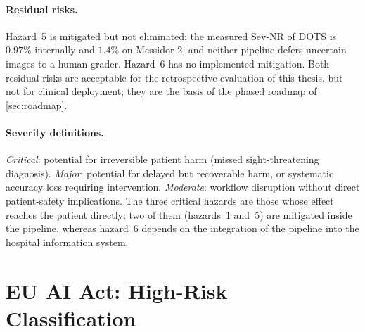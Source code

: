 \paragraph{Residual risks.}
Hazard~5 is mitigated but not eliminated: the measured Sev-NR of DOTS is $0.97\%$
internally and $1.4\%$ on Messidor-2, and neither pipeline defers uncertain images to a
human grader. Hazard~6 has no implemented mitigation. Both residual risks are acceptable
for the retrospective evaluation of this thesis, but not for clinical deployment; they are
the basis of the phased roadmap of \cref{sec:roadmap}.

\paragraph{Severity definitions.}
\emph{Critical}: potential for irreversible patient harm (missed sight-threatening
diagnosis). \emph{Major}: potential for delayed but recoverable harm, or systematic
accuracy loss requiring intervention. \emph{Moderate}: workflow disruption without direct
patient-safety implications.
The three critical hazards are those whose effect reaches the patient directly; two of
them (hazards~1 and~5) are mitigated inside the pipeline, whereas hazard~6 depends on the
integration of the pipeline into the hospital information system.

\section{EU AI Act: High-Risk Classification}
\label{sec:aiact}

